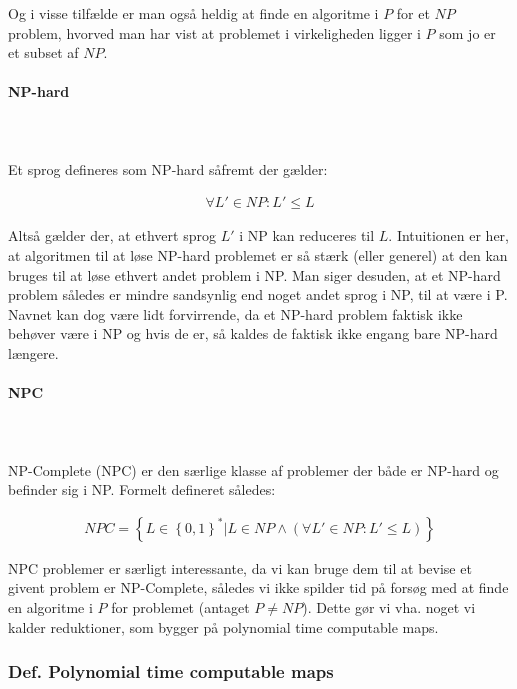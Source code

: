 Og i visse tilfælde er man også heldig at finde en algoritme i $P$ for et $NP$ problem, hvorved man har vist at problemet i virkeligheden ligger i $P$ som jo er et subset af $NP$.

\paragraph{NP-hard}
~\\
~\\
Et sprog defineres som NP-hard såfremt der gælder:

\begin{align*}
 \forall L' \in NP: L' \leq L
\end{align*}

Altså gælder der, at ethvert sprog $L'$ i NP kan reduceres til $L$. Intuitionen er her, at algoritmen til at løse NP-hard problemet er så stærk (eller generel) at den kan bruges til at løse ethvert andet problem i NP. Man siger desuden, at et NP-hard problem således er mindre sandsynlig end noget andet sprog i NP, til at være i P.\\

Navnet kan dog være lidt forvirrende, da et NP-hard problem faktisk ikke behøver være i NP og hvis de er, så kaldes de faktisk ikke engang bare NP-hard længere.

\paragraph{NPC}
~\\
~\\
NP-Complete (NPC) er den særlige klasse af problemer der både er NP-hard og befinder sig i NP. Formelt defineret således: 

\begin{align*}
 NPC = \left\lbrace L \in \left\lbrace 0,1 \right\rbrace^* | L \in NP \wedge (\forall L' \in NP: L' \leq L) \right\rbrace
\end{align*}

NPC problemer er særligt interessante, da vi kan bruge dem til at bevise et givent problem er NP-Complete, således vi ikke spilder tid på forsøg med at finde en algoritme i $P$ for problemet (antaget $P\neq NP$). Dette gør vi vha. noget vi kalder reduktioner, som bygger på polynomial time computable maps.

\subsubsection{Def. Polynomial time computable maps}

